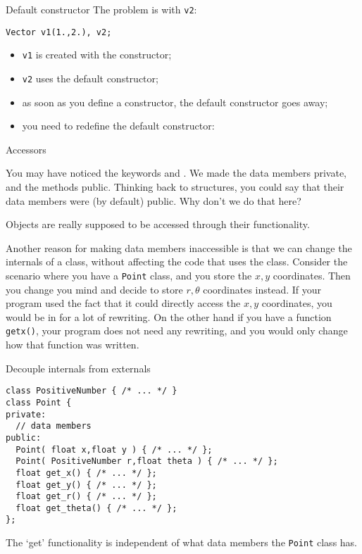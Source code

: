 \begin{slide}{Default constructor}
  \label{sl:obj-def-construct2}
  The problem is with \lstinline{v2}:
\begin{lstlisting}
Vector v1(1.,2.), v2;    
\end{lstlisting}
\begin{itemize}
\item \lstinline{v1} is created with the constructor;
\item \lstinline{v2} uses the default constructor;
\item as soon as you define a constructor, the default constructor
  goes away;
\item you need to redefine the default constructor:
\end{itemize}
\end{slide}

 {Accessors}

You may have noticed the keywords  and
. We made the data members private, and the
methods public. Thinking back to structures, you could say that their
data members were (by default) public. Why don't we do that here?

Objects are really supposed to be accessed through their
functionality.

Another reason for making data members inaccessible is that we can
change the internals of a class, without affecting the code that uses
the class. Consider the scenario where you have a \lstinline{Point} class, and
you store the $x,y$ coordinates. Then you change you mind and decide
to store $r,\theta$ coordinates instead. If your program used the fact
that it could directly access the $x,y$ coordinates, you would be in
for a lot of rewriting. On the other hand if you have a function
\lstinline{getx()}, your program does not need any rewriting, and you would
only change how that function was written.

\begin{block}{Decouple internals from externals}
  \label{sl:repr-independent}
\begin{lstlisting}
class PositiveNumber { /* ... */ }
class Point {
private:
  // data members
public:
  Point( float x,float y ) { /* ... */ };
  Point( PositiveNumber r,float theta ) { /* ... */ };
  float get_x() { /* ... */ };
  float get_y() { /* ... */ };
  float get_r() { /* ... */ };
  float get_theta() { /* ... */ };
};
\end{lstlisting}
  The `get' functionality is independent of what data members the
  \lstinline{Point} class has.
\end{block}

